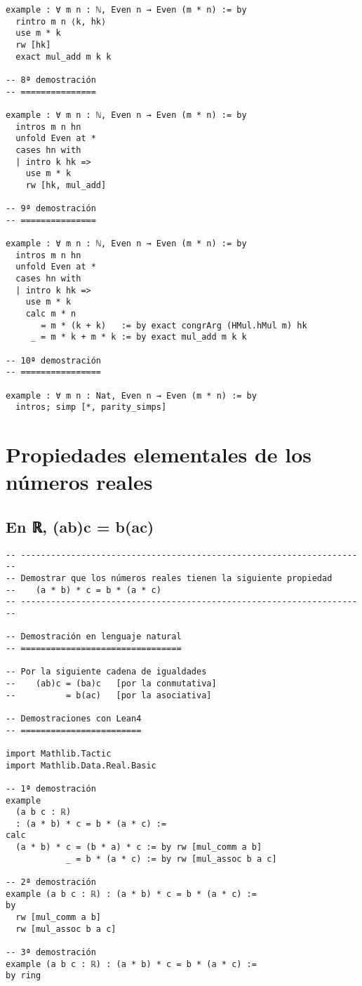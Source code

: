 \begin{verbatim}
example : ∀ m n : ℕ, Even n → Even (m * n) := by
  rintro m n ⟨k, hk⟩
  use m * k
  rw [hk]
  exact mul_add m k k

-- 8ª demostración
-- ===============

example : ∀ m n : ℕ, Even n → Even (m * n) := by
  intros m n hn
  unfold Even at *
  cases hn with
  | intro k hk =>
    use m * k
    rw [hk, mul_add]

-- 9ª demostración
-- ===============

example : ∀ m n : ℕ, Even n → Even (m * n) := by
  intros m n hn
  unfold Even at *
  cases hn with
  | intro k hk =>
    use m * k
    calc m * n
       = m * (k + k)   := by exact congrArg (HMul.hMul m) hk
     _ = m * k + m * k := by exact mul_add m k k

-- 10ª demostración
-- ================

example : ∀ m n : Nat, Even n → Even (m * n) := by
  intros; simp [*, parity_simps]
\end{verbatim}

\chapter{Propiedades elementales de los números reales}
\label{sec:orge29f418}

\section{En ℝ, (ab)c = b(ac)}
\label{sec:orgff986f9}
\begin{verbatim}
-- ---------------------------------------------------------------------
-- Demostrar que los números reales tienen la siguiente propiedad
--    (a * b) * c = b * (a * c)
-- ---------------------------------------------------------------------

-- Demostración en lenguaje natural
-- ================================

-- Por la siguiente cadena de igualdades
--    (ab)c = (ba)c   [por la conmutativa]
--          = b(ac)   [por la asociativa]

-- Demostraciones con Lean4
-- ========================

import Mathlib.Tactic
import Mathlib.Data.Real.Basic

-- 1ª demostración
example
  (a b c : ℝ)
  : (a * b) * c = b * (a * c) :=
calc
  (a * b) * c = (b * a) * c := by rw [mul_comm a b]
            _ = b * (a * c) := by rw [mul_assoc b a c]

-- 2ª demostración
example (a b c : ℝ) : (a * b) * c = b * (a * c) :=
by
  rw [mul_comm a b]
  rw [mul_assoc b a c]

-- 3ª demostración
example (a b c : ℝ) : (a * b) * c = b * (a * c) :=
by ring
\end{verbatim}

